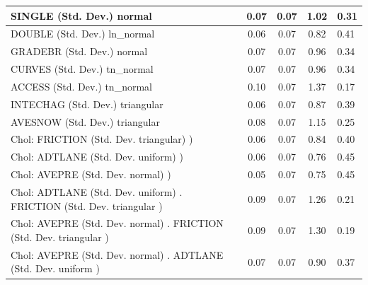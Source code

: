 \begin{table}
\begin{center}
\begin{tabular}{|l|l|c|c|c|l|}
			\hline
			SINGLE (Std. Dev.) normal &  & 0.07 & 0.07 & 1.02 & 0.31 \\
			\hline
			DOUBLE (Std. Dev.) ln_normal &  & 0.06 & 0.07 & 0.82 & 0.41 \\
			\hline
			GRADEBR (Std. Dev.) normal &  & 0.07 & 0.07 & 0.96 & 0.34 \\
			\hline
			CURVES (Std. Dev.) tn_normal &  & 0.07 & 0.07 & 0.96 & 0.34 \\
			\hline
			ACCESS (Std. Dev.) tn_normal &  & 0.10 & 0.07 & 1.37 & 0.17 \\
			\hline
			INTECHAG (Std. Dev.) triangular &  & 0.06 & 0.07 & 0.87 & 0.39 \\
			\hline
			AVESNOW (Std. Dev.) triangular &  & 0.08 & 0.07 & 1.15 & 0.25 \\
			\hline
			 Chol: FRICTION (Std. Dev. triangular) ) &  & 0.06 & 0.07 & 0.84 & 0.40 \\
			\hline
			 Chol: ADTLANE (Std. Dev. uniform) ) &  & 0.06 & 0.07 & 0.76 & 0.45 \\
			\hline
			 Chol: AVEPRE (Std. Dev. normal) ) &  & 0.05 & 0.07 & 0.75 & 0.45 \\
			\hline
			 Chol: ADTLANE (Std. Dev. uniform) . FRICTION (Std. Dev.   triangular ) &  & 0.09 & 0.07 & 1.26 & 0.21 \\
			\hline
			 Chol: AVEPRE (Std. Dev. normal) . FRICTION (Std. Dev.   triangular ) &  & 0.09 & 0.07 & 1.30 & 0.19 \\
			\hline
			 Chol: AVEPRE (Std. Dev. normal) . ADTLANE (Std. Dev.   uniform ) &  & 0.07 & 0.07 & 0.90 & 0.37 \\
			\hline
		\end{tabular}
	\end{center}
\end{table}